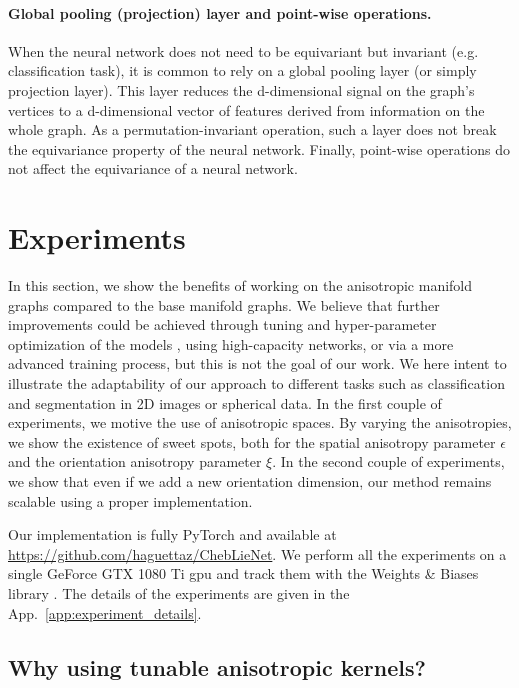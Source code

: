 \documentclass{article}
\begin{document}
\paragraph{Global pooling (projection) layer and point-wise operations.} When the neural network does not need to be equivariant but invariant (e.g. classification task), it is common to rely on a global pooling layer (or simply projection layer). This layer reduces the d-dimensional signal on the graph's vertices to a d-dimensional vector of features derived from information on the whole graph. As a permutation-invariant operation, such a layer does not break the equivariance property of the neural network. Finally, point-wise operations do not affect the equivariance of a neural network. %

\section{Experiments} \label{sec:experiments}

In this section, we show the benefits of working on the anisotropic manifold graphs compared to the base manifold graphs. We believe that further improvements could be achieved through tuning and hyper-parameter optimization of the models \citep{yu2020hyper}, using high-capacity networks, or via a more advanced training process, but this is not the goal of our work. We here intent to illustrate the adaptability of our approach to different tasks such as classification and segmentation in 2D images or spherical data. In the first couple of experiments, we motive the use of anisotropic spaces. By varying the anisotropies, we show the existence of sweet spots, both for the spatial anisotropy parameter $\epsilon$ and the orientation anisotropy parameter $\xi$. In the second couple of experiments, we show that even if we add a new orientation dimension, our method remains scalable using a proper implementation.

Our implementation is fully PyTorch \citep{pytorch} and available at \url{https://github.com/haguettaz/ChebLieNet}.
We perform all the experiments on a single GeForce GTX 1080 Ti gpu and track them with the Weights \& Biases library \citep{wandb}. The details of the experiments are given in the App.~\ref{app:experiment_details}.

\subsection{Why using tunable anisotropic kernels?}
\end{document}
